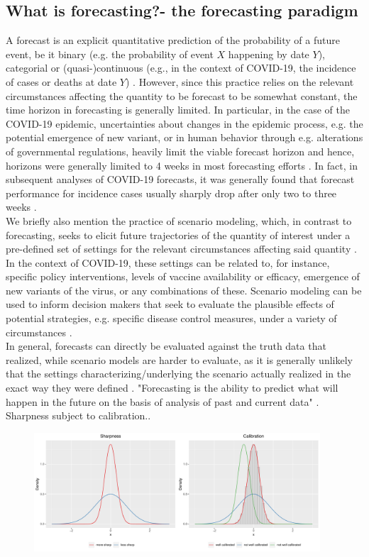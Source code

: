 \subsection{What is forecasting?- the forecasting paradigm}
A forecast is an explicit quantitative prediction of the probability of a future event, be it binary (e.g. the probability of event $X$ happening by date $Y$), categorial or (quasi-)continuous (e.g., in the context of COVID-19, the incidence of cases or deaths at date $Y$) \cite{reich_collaborative_2022}. However, since this practice relies on the relevant circumstances affecting the quantity to be forecast to be somewhat constant, the time horizon in forecasting is generally limited. In particular, in the case of the COVID-19 epidemic, uncertainties about changes in the epidemic process, e.g. the potential emergence of new variant, or in human behavior through e.g. alterations of governmental regulations, heavily limit the viable forecast horizon and hence, horizons were generally limited to 4 weeks in most forecasting efforts \cite{reich_collaborative_2022}. In fact, in subsequent analyses of COVID-19 forecasts, it was generally found that forecast performance for incidence cases usually sharply drop after only two to three weeks .\\
We briefly also mention the practice of scenario modeling, which, in contrast to forecasting, seeks to elicit future trajectories of the quantity of interest under a pre-defined set of settings for the relevant circumstances affecting said quantity \cite{reich_collaborative_2022}. In the context of COVID-19, these settings can be related to, for instance, specific policy interventions, levels of vaccine availability or efficacy, emergence of new variants of the virus, or any combinations of these. Scenario modeling can be used to inform decision makers that seek to evaluate the plausible effects of potential strategies, e.g. specific disease control measures, under a variety of circumstances \cite{reich_collaborative_2022}.\\ 
In general, forecasts can directly be evaluated against the truth data that realized, while scenario models are harder to evaluate, as it is generally unlikely that the settings characterizing/underlying the scenario actually realized in the exact way they were defined \cite{reich_collaborative_2022}.
"Forecasting is the ability to predict what will happen in the future on the basis of analysis of past and current data" \cite{moran_epidemic_2016}.
Sharpness subject to calibration.\cite{ray_ensemble_2020}.
\begin{figure}
\centering
\includegraphics[width = 0.95\textwidth]{../plots/sharp_calib.pdf}
\end{figure}

